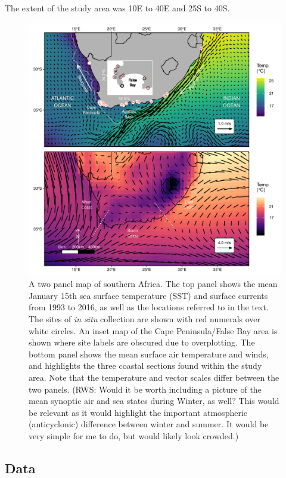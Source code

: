 \documentclass[a4paper,10pt,review]{elsarticle}
\begin{document}
The extent of the study area was 10\degree E to 40\degree E and 25\degree S to 40\degree S.

\begin{figure}
\includegraphics[width=1.0\textwidth]{figure_1.pdf}
\caption{A two panel map of southern Africa. The top panel shows the mean January 15th sea surface temperature (SST) and surface currents from 1993 to 2016, as well as the locations referred to in the text. The sites of \emph{in situ} collection are shown with red numerals over white circles. An inset map of the Cape Peninsula/False Bay area is shown where site labels are obscured due to overplotting. The bottom panel shows the mean surface air temperature and winds, and highlights the three coastal sections found within the study area. Note that the temperature and vector scales differ between the two panels. (RWS: Would it be worth including a picture of the mean synoptic air and sea states during Winter, as well? This would be relevant as it would highlight the important atmospheric (anticyclonic) difference between winter and summer. It would be very simple for me to do, but would likely look crowded.)}
\label{figure1}
\end{figure}

\subsection{Data}
\end{document}
